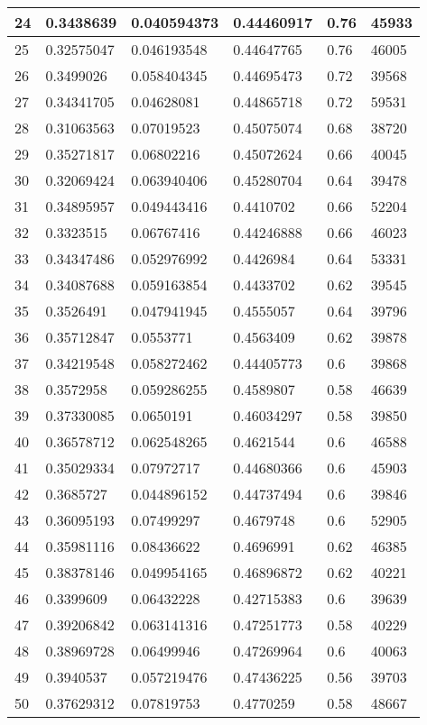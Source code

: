 \begin{longtable}{|l|l|l|l|l|l|}
24 & 0.3438639 & 0.040594373 & 0.44460917 & 0.76 & 45933 \\ \hline 
25 & 0.32575047 & 0.046193548 & 0.44647765 & 0.76 & 46005 \\ \hline 
26 & 0.3499026 & 0.058404345 & 0.44695473 & 0.72 & 39568 \\ \hline 
27 & 0.34341705 & 0.04628081 & 0.44865718 & 0.72 & 59531 \\ \hline 
28 & 0.31063563 & 0.07019523 & 0.45075074 & 0.68 & 38720 \\ \hline 
29 & 0.35271817 & 0.06802216 & 0.45072624 & 0.66 & 40045 \\ \hline 
30 & 0.32069424 & 0.063940406 & 0.45280704 & 0.64 & 39478 \\ \hline 
31 & 0.34895957 & 0.049443416 & 0.4410702 & 0.66 & 52204 \\ \hline 
32 & 0.3323515 & 0.06767416 & 0.44246888 & 0.66 & 46023 \\ \hline 
33 & 0.34347486 & 0.052976992 & 0.4426984 & 0.64 & 53331 \\ \hline 
34 & 0.34087688 & 0.059163854 & 0.4433702 & 0.62 & 39545 \\ \hline 
35 & 0.3526491 & 0.047941945 & 0.4555057 & 0.64 & 39796 \\ \hline 
36 & 0.35712847 & 0.0553771 & 0.4563409 & 0.62 & 39878 \\ \hline 
37 & 0.34219548 & 0.058272462 & 0.44405773 & 0.6 & 39868 \\ \hline 
38 & 0.3572958 & 0.059286255 & 0.4589807 & 0.58 & 46639 \\ \hline 
39 & 0.37330085 & 0.0650191 & 0.46034297 & 0.58 & 39850 \\ \hline 
40 & 0.36578712 & 0.062548265 & 0.4621544 & 0.6 & 46588 \\ \hline 
41 & 0.35029334 & 0.07972717 & 0.44680366 & 0.6 & 45903 \\ \hline 
42 & 0.3685727 & 0.044896152 & 0.44737494 & 0.6 & 39846 \\ \hline 
43 & 0.36095193 & 0.07499297 & 0.4679748 & 0.6 & 52905 \\ \hline 
44 & 0.35981116 & 0.08436622 & 0.4696991 & 0.62 & 46385 \\ \hline 
45 & 0.38378146 & 0.049954165 & 0.46896872 & 0.62 & 40221 \\ \hline 
46 & 0.3399609 & 0.06432228 & 0.42715383 & 0.6 & 39639 \\ \hline 
47 & 0.39206842 & 0.063141316 & 0.47251773 & 0.58 & 40229 \\ \hline 
48 & 0.38969728 & 0.06499946 & 0.47269964 & 0.6 & 40063 \\ \hline 
49 & 0.3940537 & 0.057219476 & 0.47436225 & 0.56 & 39703 \\ \hline 
50 & 0.37629312 & 0.07819753 & 0.4770259 & 0.58 & 48667 \\ \hline 
\end{longtable}
